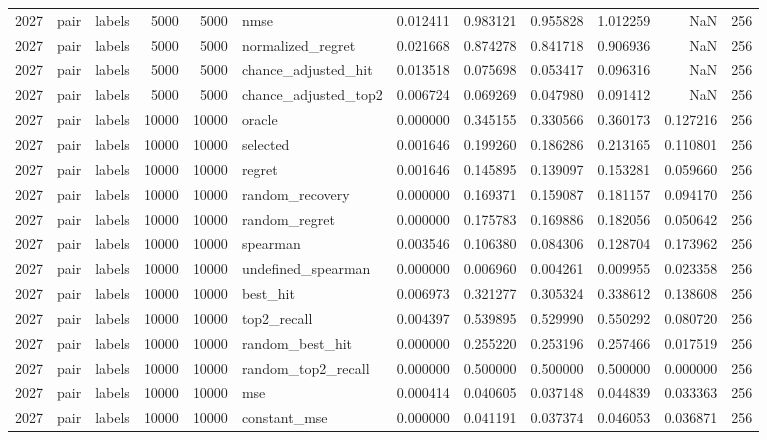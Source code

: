 \begin{tabular}{rllrrlrrrrrr}
2027 & pair & labels & 5000 & 5000 & nmse & 0.012411 & 0.983121 & 0.955828 & 1.012259 & NaN & 256 \\
2027 & pair & labels & 5000 & 5000 & normalized_regret & 0.021668 & 0.874278 & 0.841718 & 0.906936 & NaN & 256 \\
2027 & pair & labels & 5000 & 5000 & chance_adjusted_hit & 0.013518 & 0.075698 & 0.053417 & 0.096316 & NaN & 256 \\
2027 & pair & labels & 5000 & 5000 & chance_adjusted_top2 & 0.006724 & 0.069269 & 0.047980 & 0.091412 & NaN & 256 \\
2027 & pair & labels & 10000 & 10000 & oracle & 0.000000 & 0.345155 & 0.330566 & 0.360173 & 0.127216 & 256 \\
2027 & pair & labels & 10000 & 10000 & selected & 0.001646 & 0.199260 & 0.186286 & 0.213165 & 0.110801 & 256 \\
2027 & pair & labels & 10000 & 10000 & regret & 0.001646 & 0.145895 & 0.139097 & 0.153281 & 0.059660 & 256 \\
2027 & pair & labels & 10000 & 10000 & random_recovery & 0.000000 & 0.169371 & 0.159087 & 0.181157 & 0.094170 & 256 \\
2027 & pair & labels & 10000 & 10000 & random_regret & 0.000000 & 0.175783 & 0.169886 & 0.182056 & 0.050642 & 256 \\
2027 & pair & labels & 10000 & 10000 & spearman & 0.003546 & 0.106380 & 0.084306 & 0.128704 & 0.173962 & 256 \\
2027 & pair & labels & 10000 & 10000 & undefined_spearman & 0.000000 & 0.006960 & 0.004261 & 0.009955 & 0.023358 & 256 \\
2027 & pair & labels & 10000 & 10000 & best_hit & 0.006973 & 0.321277 & 0.305324 & 0.338612 & 0.138608 & 256 \\
2027 & pair & labels & 10000 & 10000 & top2_recall & 0.004397 & 0.539895 & 0.529990 & 0.550292 & 0.080720 & 256 \\
2027 & pair & labels & 10000 & 10000 & random_best_hit & 0.000000 & 0.255220 & 0.253196 & 0.257466 & 0.017519 & 256 \\
2027 & pair & labels & 10000 & 10000 & random_top2_recall & 0.000000 & 0.500000 & 0.500000 & 0.500000 & 0.000000 & 256 \\
2027 & pair & labels & 10000 & 10000 & mse & 0.000414 & 0.040605 & 0.037148 & 0.044839 & 0.033363 & 256 \\
2027 & pair & labels & 10000 & 10000 & constant_mse & 0.000000 & 0.041191 & 0.037374 & 0.046053 & 0.036871 & 256 \\

\end{tabular}
